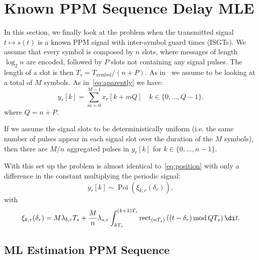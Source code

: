 \section{Known PPM Sequence Delay MLE}
\label{sec:Known-PPM-sequence-Delay-Estimation}

In this section, we finally look at the problem when the transmitted signal \(t\mapsto s(t)\) is a known PPM signal with inter-symbol guard times (ISGTs). We assume that every symbol is composed by \(n\) slots, where messages of length \(\log_2n\) are encoded, followed by \(P\) slots not containing any signal pulses. The length of a slot is then \(T_s=T_{\text{symbol}}/(n+P)\). As in~ we assume to be looking at a total of \(M\) symbols. As in~\eqref{eq:aparently} we have:
\begin{equation}
y_r[k]=\sum_{m=0}^{M-1}x_r[k+mQ] \quad k\in\{0,\ldots,Q-1\}.
\label{eq:aparently2}
\end{equation}
where \(Q=n+P\).

\noindent
If we assume the signal slots to be deterministically uniform (i.e. the same number of pulses appear in each signal slot over the duration of the \(M\) symbols), then there are \(M/n\) aggregated pulses in \(y_r[k]\) for \(k\in\{0,\ldots,n-1\}\).

\noindent
With this set up the problem is almost identical to~\eqref{eq:position} with only a difference in the constant multiplying the periodic signal:
\begin{equation}
y_r[k]\sim
\operatorname{Poi}
\left(\xi_{k,r}(\delta_r)\right),
\end{equation}
with
\begin{equation}
\begin{aligned}
\xi_{k,r}(\delta_r)
=  M\lambda_{b,r} T_s+\frac{M}{n}\lambda_{s,r} \int_{kT_s}^{(k+1)T_s}  \operatorname{rect}_{(nT_s)} \left((t-\delta_r) \,\text{mod}\, QT_s\right) \di t.
\end{aligned}
\end{equation}

\subsection{ML Estimation PPM Sequence}

